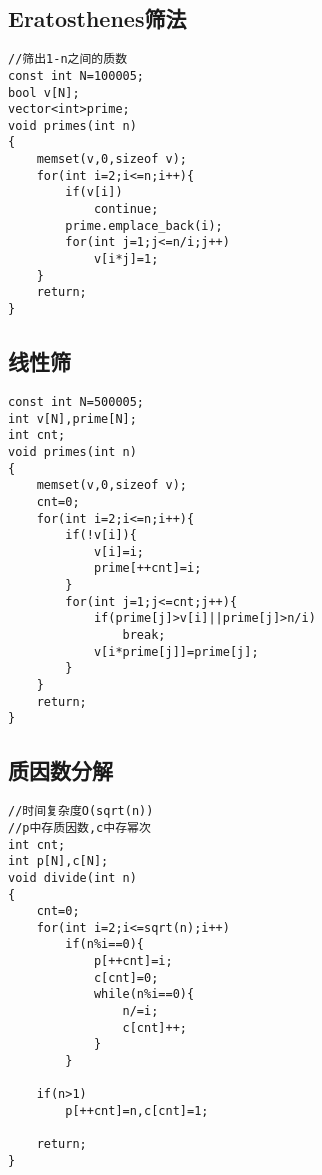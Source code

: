 \documentclass[twocolumn,a4]{article}
\begin{document}
\subsection{Eratosthenes筛法}
\begin{lstlisting}
//筛出1-n之间的质数
const int N=100005;
bool v[N];
vector<int>prime;
void primes(int n)
{
    memset(v,0,sizeof v);
    for(int i=2;i<=n;i++){
        if(v[i])
            continue;
        prime.emplace_back(i);
        for(int j=1;j<=n/i;j++)
            v[i*j]=1;
    }
    return;
}
\end{lstlisting}

\subsection{线性筛}
\begin{lstlisting}
const int N=500005;
int v[N],prime[N];
int cnt;
void primes(int n)
{
    memset(v,0,sizeof v);
    cnt=0;
    for(int i=2;i<=n;i++){
        if(!v[i]){
            v[i]=i;
            prime[++cnt]=i;
        }
        for(int j=1;j<=cnt;j++){
            if(prime[j]>v[i]||prime[j]>n/i)
                break;
            v[i*prime[j]]=prime[j];
        }
    }
    return;
}
\end{lstlisting}

\subsection{质因数分解}
\begin{lstlisting}
//时间复杂度O(sqrt(n))
//p中存质因数,c中存幂次
int cnt;
int p[N],c[N];
void divide(int n)
{
    cnt=0;
    for(int i=2;i<=sqrt(n);i++)
        if(n%i==0){
            p[++cnt]=i;
            c[cnt]=0;
            while(n%i==0){
                n/=i;
                c[cnt]++;
            }
        }

    if(n>1)
        p[++cnt]=n,c[cnt]=1;
    
    return;
}
\end{lstlisting}
\end{document}
